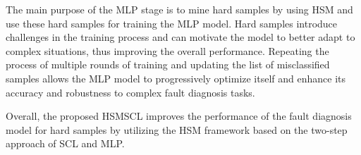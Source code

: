 \documentclass[lettersize,journal]{IEEEtran}
\begin{document}
The main purpose of the MLP stage is to mine hard samples by using HSM and use these hard samples for training the MLP model. Hard samples introduce challenges in the training process and can motivate the model to better adapt to complex situations, thus improving the overall performance. Repeating the process of multiple rounds of training and updating the list of misclassified samples allows the MLP model to progressively optimize itself and enhance its accuracy and robustness to complex fault diagnosis tasks.

Overall, the proposed HSMSCL improves the performance of the fault diagnosis model for hard samples by utilizing the HSM framework based on the two-step approach of SCL and MLP.%

\end{document}
